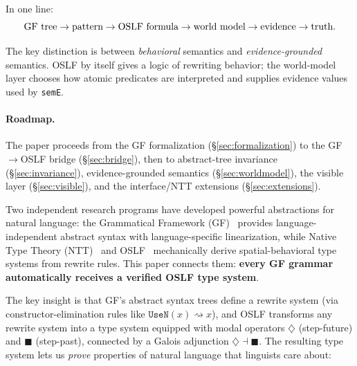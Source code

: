 \documentclass[11pt]{article}
\newcommand{\code}[1]{\texttt{#1}}
\newcommand{\Dia}{\ensuremath{\diamondsuit}}
\newcommand{\Bx}{\ensuremath{\blacksquare}}
\newcommand{\OSLF}{\textup{OSLF}}
\newcommand{\GF}{\textup{GF}}
\newcommand{\NTT}{\textup{NTT}}
\begin{document}
In one line:
\[
\text{\GF{} tree} \to \text{pattern} \to \text{\OSLF{} formula}
\to \text{world model} \to \text{evidence} \to \text{truth}.
\]

The key distinction is between \emph{behavioral} semantics and
\emph{evidence-grounded} semantics.  \OSLF{} by itself gives a logic of
rewriting behavior; the world-model layer chooses how atomic predicates are
interpreted and supplies evidence values used by \code{semE}.

\paragraph{Roadmap.}  The paper proceeds from the \GF{} formalization
(\S\ref{sec:formalization}) to the \GF{}$\to$\OSLF{} bridge
(\S\ref{sec:bridge}), then to abstract-tree invariance
(\S\ref{sec:invariance}), evidence-grounded semantics
(\S\ref{sec:worldmodel}), the visible layer (\S\ref{sec:visible}), and
the interface/\NTT{} extensions (\S\ref{sec:extensions}).

Two independent research programs have developed powerful abstractions for
natural language: the Grammatical Framework (\GF{})~\cite{Ranta2004,Ranta2011}
provides language-independent abstract syntax with language-specific
linearization, while Native Type Theory (\NTT{})~\cite{WilliamsStay2021} and
\OSLF{}~\cite{MeredithStayOSLF2020} mechanically derive spatial-behavioral type systems from
rewrite rules.  This paper connects them: \textbf{every \GF{} grammar
automatically receives a verified \OSLF{} type system}.

The key insight is that \GF{}'s abstract syntax trees define a rewrite system
(via constructor-elimination rules like $\code{UseN}(x) \rightsquigarrow x$),
and \OSLF{} transforms any rewrite system into a type system equipped with
modal operators $\Dia$ (step-future) and $\Bx$ (step-past), connected by a
Galois adjunction $\Dia \dashv \Bx$.  The resulting type system lets us
\emph{prove} properties of natural language that linguists care about:
\end{document}
